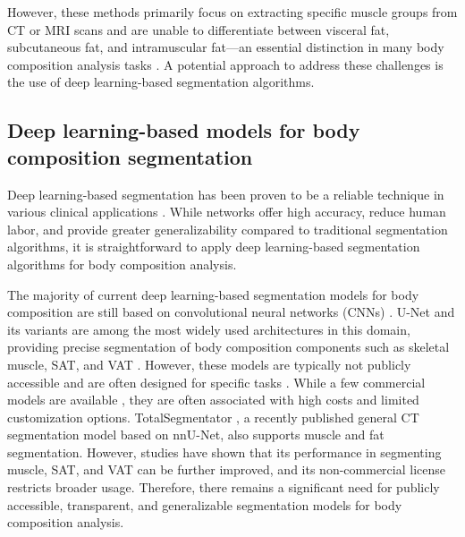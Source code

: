 However, these methods primarily focus on extracting specific muscle groups from CT or MRI scans and are unable to differentiate between visceral fat, subcutaneous fat, and intramuscular fat—an essential distinction in many body composition analysis tasks \citep{staley2019visceral, torres2013nutritional, iwase2016impact}. A potential approach to address these challenges is the use of deep learning-based segmentation algorithms.

\subsection{Deep learning-based models for body composition segmentation}
Deep learning-based segmentation has been proven to be a reliable technique in various clinical applications \citep{gu2024segmentanybone, dong2024segment, wasserthal2023totalsegmentator, mazurowski2023segment}. While networks offer high accuracy, reduce human labor, and provide greater generalizability compared to traditional segmentation algorithms, it is straightforward to apply deep learning-based segmentation algorithms for body composition analysis.

The majority of current deep learning-based segmentation models for body composition are still based on convolutional neural networks (CNNs) \citep{nowak2020fully}. U-Net and its variants are among the most widely used architectures in this domain, providing precise segmentation of body composition components such as skeletal muscle, SAT, and VAT \citep{paris2020body, weston2019automated}. However, these models are typically not publicly accessible and are often designed for specific tasks \citep{mai2023systematic}. While a few commercial models are available \citep{cespedes2020evaluation, mai2023systematic, lee2021deep}, they are often associated with high costs and limited customization options. TotalSegmentator \citep{wasserthal2023totalsegmentator}, a recently published general CT segmentation model based on nnU-Net, also supports muscle and fat segmentation. However, studies have shown that its performance in segmenting muscle, SAT, and VAT can be further improved, and its non-commercial license restricts broader usage. Therefore, there remains a significant need for publicly accessible, transparent, and generalizable segmentation models for body composition analysis.
